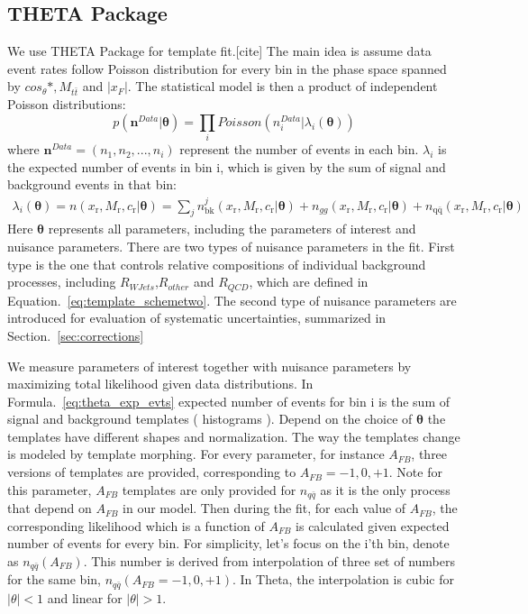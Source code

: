 \documentclass{cmspaperpdf}
\begin{document}
\subsection{THETA Package}
\label{sec:theta_methods}
We use THETA Package for template fit.[cite] The main idea is assume data event rates follow Poisson distribution for every bin in the phase space spanned by $cos_\theta*,M_{t\bar{t}}$ and $|x_F|$. The statistical model is then a product of independent Poisson distributions:
\begin{equation}
p(\bm{n}^{Data}|\bm\theta)=\prod_i Poisson(n_i^{Data}|\lambda_i(\bm\theta))
\label{eq:theta_likelihood}
\end{equation}
where $\bm{n}^{Data}=(n_1,n_2,...,n_i)$ represent the number of events in each bin. $\lambda_i$ is the expected number of events in bin i, which is given by the sum of signal and background events in that bin:
\begin{align}
\lambda_i(\bm\theta) = n(x_\mathrm{r},M_\mathrm{r},c_\mathrm{r}|\bm\theta) = \sum_j n^j_\mathrm{bk}(x_\mathrm{r},M_\mathrm{r},c_\mathrm{r}|\bm\theta)+n_{gg}(x_\mathrm{r},M_\mathrm{r},c_\mathrm{r}|\bm\theta) +n_\mathrm{q\bar{q}}(x_\mathrm{r}, M_\mathrm{r}, c_\mathrm{r}|\bm\theta)
\label{eq:theta_exp_evts}
\end{align}
Here $\bm\theta$ represents all parameters, including the parameters of interest and nuisance parameters. There are two types of nuisance parameters in the fit. First type is the one that controls relative compositions of individual background processes, including $R_{WJets}$,$R_{other}$ and $R_{QCD}$, which are defined in Equation.~\ref{eq:template_schemetwo}. The second type of nuisance parameters are introduced for evaluation of systematic uncertainties, summarized in Section.~\ref{sec:corrections}

We measure parameters of interest together with nuisance parameters by maximizing total likelihood given data distributions. In Formula.~\ref{eq:theta_exp_evts}  expected number of events for bin i is the sum of signal and background templates ( histograms ). Depend on the choice of $\bm\theta$ the templates have different shapes and normalization. The way the templates change is modeled by template morphing. For every parameter, for instance $A_{FB}$, three versions of templates are provided, corresponding to $A_{FB}= -1,0,+1$. Note for this parameter, $A_{FB}$ templates are only provided for $n_{q\bar{q}}$ as it is the only process that depend on $A_{FB}$ in our model. Then during the fit, for each value of $A_{FB}$, the corresponding likelihood which is a function of $A_{FB}$ is calculated given expected number of events for every bin. For simplicity, let's focus on the i'th bin, denote as $n_{q\bar{q}}(A_{FB})$. This number is derived from interpolation of three set of numbers for the same bin,  $n_{q\bar{q}}(A_{FB}=-1,0,+1)$. In Theta, the interpolation is cubic for $|\theta|<1$ and linear for $|\theta|>1$.
\end{document}
